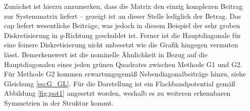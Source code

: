 Zunächst ist hierzu anzumerken, dass die Matrix den einzig komplexen Beitrag zur Systemmatrix liefert -- gezeigt ist an dieser Stelle lediglich der Betrag. Das \ac{cap} liefert wesentliche Beiträge, was jedoch in diesem Beispiel der sehr groben Diskretisierung in $y$-Richtung geschuldet ist. Ferner ist die Hauptdiagonale für eine feinere Diskretisierung nicht unbesetzt wie die Grafik hingegen vermuten lässt. Bemerkenswert ist die nominelle Ähnlichkeit in Bezug auf die Hauptdiagonalen eines jeden grünen Quadrates zwischen Methode G1 und G2. Für Methode G2 kommen erwartungsgemäß Nebendiagonalbeiträge hinzu, siehe Gleichung \eqref{eq:G_GL}. Für die Darstellung ist ein Flachbandpotential gemäß Abbildung \ref{fig:pot1} angesetzt worden, weshalb es zu weiteren erkennbaren Symmetrien in der Struktur kommt.
